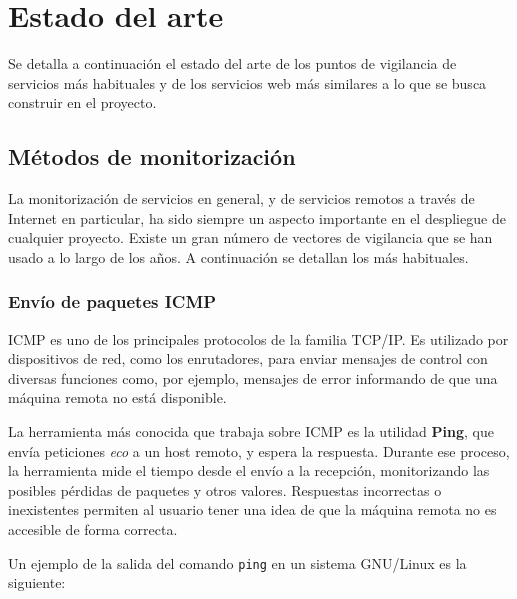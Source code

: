 \section{Estado del arte}
\label{sec:estado-del-arte}

Se detalla a continuación el estado del arte de los puntos de vigilancia de
servicios más habituales y de los servicios web más similares a lo que se busca
construir en el proyecto.

\subsection{Métodos de monitorización}

La monitorización de servicios en general, y de servicios remotos a través de
Internet en particular, ha sido siempre un aspecto importante en el despliegue
de cualquier proyecto. Existe un gran número de vectores de vigilancia que se
han usado a lo largo de los años. A continuación se detallan los más habituales.

\subsubsection{Envío de paquetes ICMP}

\ac{ICMP} es uno de los principales protocolos de la familia TCP/IP. Es
utilizado por dispositivos de red, como los enrutadores, para enviar mensajes de
control con diversas funciones como, por ejemplo, mensajes de error informando
de que una máquina remota no está disponible.

La herramienta más conocida que trabaja sobre ICMP es la utilidad \textbf{Ping},
que envía peticiones \textit{eco} a un host remoto, y espera la
respuesta. Durante ese proceso, la herramienta mide el tiempo desde el envío a
la recepción, monitorizando las posibles pérdidas de paquetes y otros
valores. Respuestas incorrectas o inexistentes permiten al usuario tener una
idea de que la máquina remota no es accesible de forma correcta.

Un ejemplo de la salida del comando \texttt{ping} en un sistema GNU/Linux es la
siguiente:



